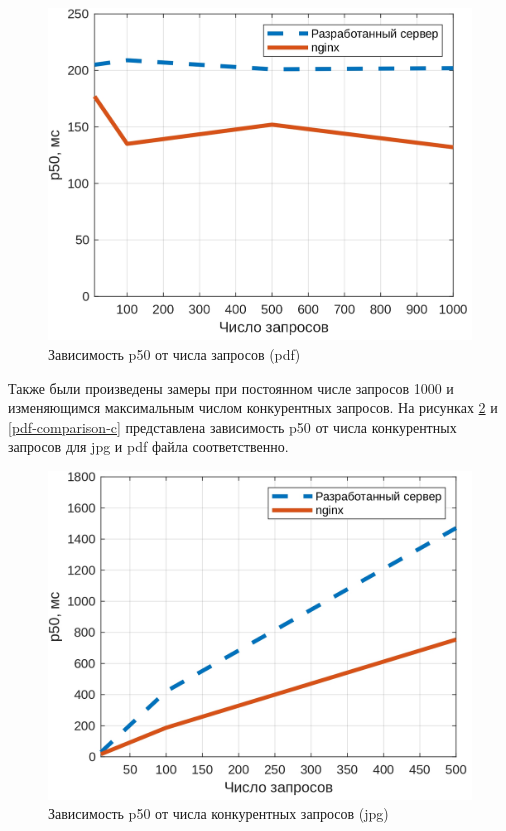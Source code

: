 \captionsetup{singlelinecheck = false, justification=centering}
\begin{figure}[H]
	\centering
	\includegraphics[scale=0.9]{img/pdf.jpg}
	\caption{Зависимость p50 от числа запросов (pdf)}
	\label{pdf-comparison-n}
\end{figure}

Также были произведены замеры при постоянном числе запросов 1000 и изменяющимся максимальным числом конкурентных запросов. На рисунках \ref{jpg-comparison-c} и \ref{pdf-comparison-c} представлена зависимость p50 от числа конкурентных запросов для jpg и pdf файла соответственно.

\begin{figure}[H]
	\centering
	\includegraphics[scale=0.9]{img/jpg-c.jpg}
	\caption{Зависимость p50 от числа конкурентных запросов (jpg)}
	\label{jpg-comparison-c}
\end{figure}

